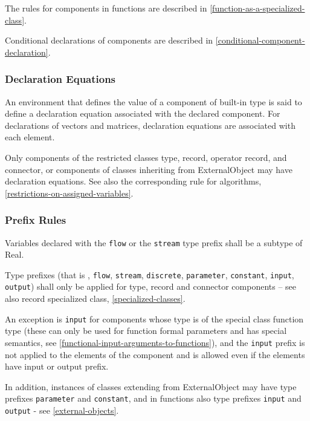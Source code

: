 The rules for components in functions are described in \autoref{function-as-a-specialized-class}.

Conditional declarations of components are described in \autoref{conditional-component-declaration}.

\subsubsection{Declaration Equations}

An environment that defines the value of a component of built-in type is
said to define a declaration equation associated with the declared
component. For declarations of vectors and matrices, declaration
equations are associated with each element.

Only components of the restricted classes type, record, operator record, and connector, or components of classes inheriting from ExternalObject
may have declaration equations. See also the corresponding rule for algorithms, \autoref{restrictions-on-assigned-variables}.

\subsubsection{Prefix Rules}

Variables declared with the \lstinline!flow! or the \lstinline!stream! type prefix shall be a
subtype of Real.

Type prefixes (that is , \lstinline!flow!, \lstinline!stream!, \lstinline!discrete!,
\lstinline!parameter!, \lstinline!constant!,
\lstinline!input!, \lstinline!output!) shall only be applied for type, record and connector
components -- see also record specialized class, \autoref{specialized-classes}.

An exception is \lstinline!input! for components whose type is of the special class
function type (these can only be used for function formal parameters and
has special semantics, see \autoref{functional-input-arguments-to-functions}), and the \lstinline!input! prefix is not
applied to the elements of the component and is allowed even if the
elements have input or output prefix.

In addition, instances of classes extending from ExternalObject may have
type prefixes \lstinline!parameter! and \lstinline!constant!, and in functions also type
prefixes \lstinline!input! and \lstinline!output! - see \autoref{external-objects}.

